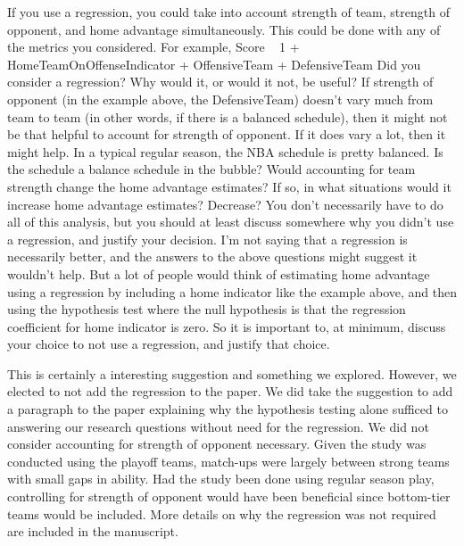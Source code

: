 \documentclass[12pt]{article}
\newenvironment{comment}%
{\begin{quoting}\noindent\small\it\ignorespaces%
  }{\end{quoting}}
\begin{document}
 
\begin{comment}
If you use a regression, you could take into account strength of team, strength of opponent, and home
advantage simultaneously. This could be done with any of the metrics you considered. For example,
Score ~ 1 + HomeTeamOnOffenseIndicator + OffensiveTeam + DefensiveTeam
Did you consider a regression? Why would it, or would it not, be useful? If strength of opponent (in the
example above, the DefensiveTeam) doesn’t vary much from team to team (in other words, if there is a
balanced schedule), then it might not be that helpful to account for strength of opponent. If it does vary a
lot, then it might help.
In a typical regular season, the NBA schedule is pretty balanced. Is the schedule a balance schedule in the
bubble?
Would accounting for team strength change the home advantage estimates? If so, in what situations would
it increase home advantage estimates? Decrease?
You don’t necessarily have to do all of this analysis, but you should at least discuss somewhere why you
didn’t use a regression, and justify your decision. I’m not saying that a regression is necessarily better,
and the answers to the above questions might suggest it wouldn’t help. But a lot of people would think of
estimating home advantage using a regression by including a home indicator like the example above, and
then using the hypothesis test where the null hypothesis is that the regression coefficient for home indicator
is zero. So it is important to, at minimum, discuss your choice to not use a regression, and justify that
choice.
\end{comment}

 This is certainly a interesting suggestion and something we explored. However, we elected to not add the regression to the paper. We did take the suggestion to add a paragraph to the paper explaining why the hypothesis testing alone sufficed to answering our research questions without need for the regression. We did not consider accounting for strength of opponent necessary. Given the study was conducted using the playoff teams, match-ups were largely between strong teams with small gaps in ability. Had the study been done using regular season play, controlling for strength of opponent would have been beneficial since bottom-tier teams would be included. More details on why the regression was not required are included in the manuscript.
\end{document}
